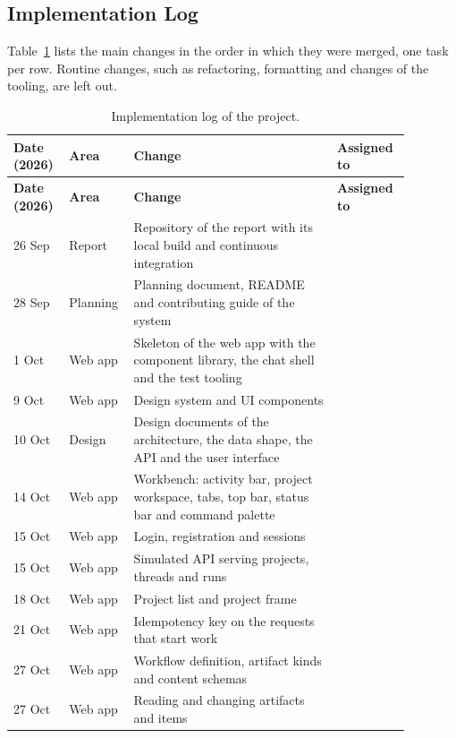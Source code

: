 \begin{appendices}
\section{Implementation Log}
\label{apx:pm-log}
Table~\ref{tab:apx-log} lists the main changes in the order in which they were merged, one task per row. Routine changes, such as refactoring, formatting and changes of the tooling, are left out.

\begingroup{}
\begin{longtable}{|p{0.12\linewidth}|p{0.12\linewidth}|p{0.48\linewidth}|p{0.16\linewidth}|}
    \caption{Implementation log of the project.}
    \label{tab:apx-log} \\
    \hline
    \textbf{Date (2026)} & \textbf{Area} & \textbf{Change} & \textbf{Assigned to} \\
    \hline
    \endfirsthead
    \hline
    \textbf{Date (2026)} & \textbf{Area} & \textbf{Change} & \textbf{Assigned to} \\
    \hline
    \endhead
    26 Sep & Report & Repository of the report with its local build and continuous integration & \\ \hline
    28 Sep & Planning & Planning document, README and contributing guide of the system & \\ \hline
    1 Oct & Web app & Skeleton of the web app with the component library, the chat shell and the test tooling & \\ \hline
    9 Oct & Web app & Design system and UI components & \\ \hline
    10 Oct & Design & Design documents of the architecture, the data shape, the API and the user interface & \\ \hline
    14 Oct & Web app & Workbench: activity bar, project workspace, tabs, top bar, status bar and command palette & \\ \hline
    15 Oct & Web app & Login, registration and sessions & \\ \hline
    15 Oct & Web app & Simulated API serving projects, threads and runs & \\ \hline
    18 Oct & Web app & Project list and project frame & \\ \hline
    21 Oct & Web app & Idempotency key on the requests that start work & \\ \hline
    27 Oct & Web app & Workflow definition, artifact kinds and content schemas & \\ \hline
    27 Oct & Web app & Reading and changing artifacts and items & \\ \hline

\end{longtable}
\end{appendices}
